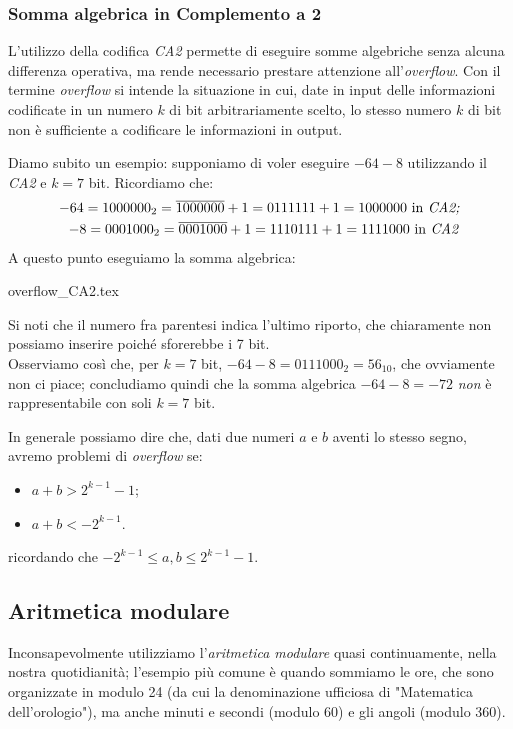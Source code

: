 \documentclass[class=book, crop=false, oneside]{standalone}
\begin{document}
\subsubsection{Somma algebrica in Complemento a 2}
L'utilizzo della codifica \emph{CA2} permette di eseguire somme algebriche senza alcuna differenza operativa, ma rende necessario prestare attenzione all'\emph{overflow}. Con il termine \emph{overflow} si intende la situazione in cui, date in input delle informazioni codificate in un numero \(k\) di bit arbitrariamente scelto, lo stesso numero \(k\) di bit non è sufficiente a codificare le informazioni in output.

Diamo subito un esempio: supponiamo di voler eseguire \(-64-8\) utilizzando il \emph{CA2} e \(k=7\) bit. Ricordiamo che:
\begin{align*}
-64=1000000_{2}=\overline{1000000}+1=0111111+1=1000000 \text{ in \emph{CA2;}}\\
-8=0001000_{2}=\overline{0001000}+1=1110111+1=1111000 \text{ in \emph{CA2}}
\end{align*}
A questo punto eseguiamo la somma algebrica:
\begin{table}[H]
	\centering
	{overflow_CA2.tex}
\end{table}
Si noti che il numero fra parentesi indica l'ultimo riporto, che chiaramente non possiamo inserire poiché sforerebbe i 7 bit.\\
Osserviamo così che, per \(k=7\) bit, \(-64-8=0111000_{2}=56_{10}\), che ovviamente non ci piace; concludiamo quindi che la somma algebrica \(-64-8=-72\) \emph{non} è rappresentabile con soli \(k=7\) bit.

In generale possiamo dire che, dati due numeri \(a\) e \(b\) aventi lo stesso segno, avremo problemi di \emph{overflow} se:
\begin{itemize}
	\item \(a+b>2^{k-1}-1\);
	\item \(a+b<-2^{k-1}\).
\end{itemize}
ricordando che \(-2^{k-1}\le a,b\le 2^{k-1}-1\).

\subsection{Aritmetica modulare}
Inconsapevolmente utilizziamo l'\emph{aritmetica modulare} quasi continuamente, nella nostra quotidianità; l'esempio più comune è quando sommiamo le ore, che sono organizzate in modulo 24 (da cui la denominazione ufficiosa di "Matematica dell'orologio"), ma anche minuti e secondi (modulo 60) e gli angoli (modulo 360).
\end{document}
